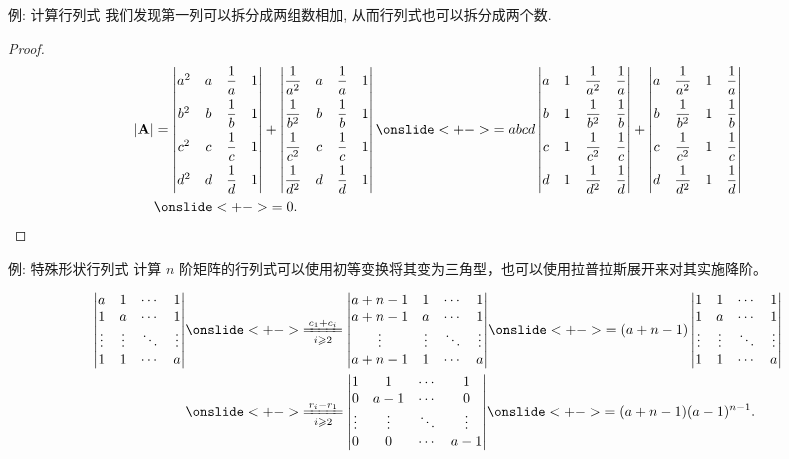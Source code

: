 \begin{frame}{例: 计算行列式}
	\onslide<+->
	我们发现第一列可以拆分成两组数相加, 从而行列式也可以拆分成两个数.
	\onslide<+->
	\begin{proof}
		\begin{align*}
			|\bfA|&=\detm{
				a^2&a&\dfrac1a&1\\[7pt]
				b^2&b&\dfrac1b&1\\[7pt]
				c^2&c&\dfrac1c&1\\[7pt]
				d^2&d&\dfrac1d&1}+\detm{
				\dfrac1{a^2}&a&\dfrac1a&1\\[7pt]
				\dfrac1{b^2}&b&\dfrac1b&1\\[7pt]
				\dfrac1{c^2}&c&\dfrac1c&1\\[7pt]
				\dfrac1{d^2}&d&\dfrac1d&1}
			\onslide<+->{=abcd\detm{
				a&1&\dfrac1{a^2}&\dfrac1a\\[7pt]
				b&1&\dfrac1{b^2}&\dfrac1b\\[7pt]
				c&1&\dfrac1{c^2}&\dfrac1c\\[7pt]
				d&1&\dfrac1{d^2}&\dfrac1d}+\detm{
				a&\dfrac1{a^2}&1&\dfrac1a\\[7pt]
				b&\dfrac1{b^2}&1&\dfrac1b\\[7pt]
				c&\dfrac1{c^2}&1&\dfrac1c\\[7pt]
				d&\dfrac1{d^2}&1&\dfrac1d}}\\
				&\onslide<+->{=0.}\qedhere
		\end{align*}
	\end{proof}
\end{frame}


\begin{frame}{例: 特殊形状行列式}
	\onslide<+->
	计算 $n$ 阶矩阵的行列式可以使用初等变换将其变为三角型，也可以使用拉普拉斯展开来对其实施降阶。
	\onslide<+->
	\begin{example}
		\begin{align*}
			\detm{
			a&1&\cdots&1\\
			1&a&\cdots&1\\
			\vdots&\vdots&\ddots&\vdots\\
			1&1&\cdots&a
		}
		&\onslide<+->{\xeq[i\ge2]{c_1+c_i}\detm{
			a+n-1&1&\cdots&1\\
			a+n-1&a&\cdots&1\\
			\vdots&\vdots&\ddots&\vdots\\
			a+n-1&1&\cdots&a
		}}
		\onslide<+->{=(a+n-1)\detm{
			1&1&\cdots&1\\
			1&a&\cdots&1\\
			\vdots&\vdots&\ddots&\vdots\\
			1&1&\cdots&a
		}}\\
		&\onslide<+->{\xeq[i\ge2]{r_i-r_1}\detm{
			1&1&\cdots&1\\
			0&a-1&\cdots&0\\
			\vdots&\vdots&\ddots&\vdots\\
			0&0&\cdots&a-1
		}}
		\onslide<+->{=(a+n-1)(a-1)^{n-1}.}
		\end{align*}
	\end{example}
\end{frame}


